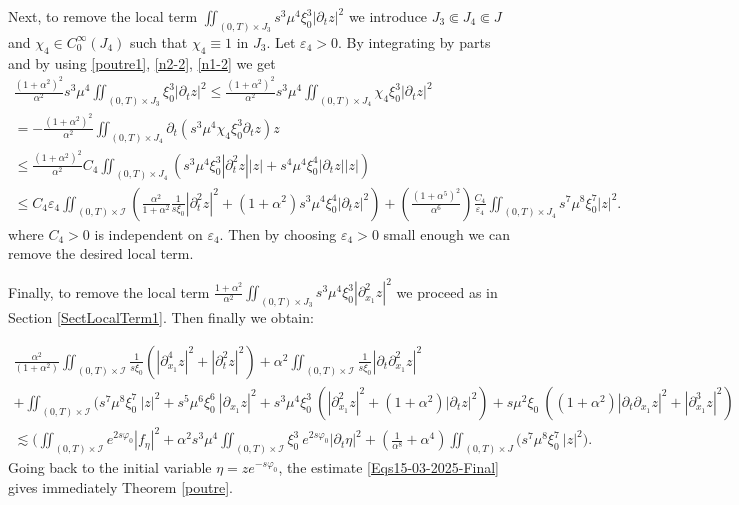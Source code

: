 \documentclass[a4paper, 12pt]{article}
\theoremstyle{plain}
\theoremstyle{definition}
\numberwithin{theorem}{section}
\numberwithin{equation}{section}
\begin{document}
{Next, to remove the local term $\iint_{(0,T)\times J_3}s^3\mu^4\xi^3_0|\partial_tz|^2$ we introduce $J_3\Subset J_4\Subset J$ and $\chi_4\in C_0^\infty(J_4)$ such that $\chi_4\equiv 1$ in $J_3$. Let $\varepsilon_4>0$. 
By integrating by parts and by using \eqref{poutre1}, \eqref{n2-2}, \eqref{n1-2} we get 
\begin{multline*}
    \frac{(1+\alpha^2)^2}{\alpha^2} s^3\mu^4 \iint_{(0,T)\times J_3}\xi_0^3|\partial_t z|^2\leq \frac{(1+\alpha^2)^2}{\alpha^2} s^3\mu^4 \iint_{(0,T)\times J_4}\chi_4\xi^3_0 |\partial_tz|^2\\
    =
     - \frac{(1+\alpha^2)^2}{\alpha^2} \iint_{(0,T)\times J_4}\partial_t(s^3\mu^4\chi_4\xi_0^3\partial_t z) z\\
    \leq \frac{(1+\alpha^2)^2}{\alpha^2} C_4 \iint_{(0,T)\times J_4}(s^3\mu^4\xi_0^3|\partial_t^2 z||z|+s^4\mu^4\xi_0^4|\partial_t z||z|) \\
    \leq C_4 \varepsilon_4 \iint_{(0,T)\times \mathcal{I}}\left(\frac{\alpha^2}{1+\alpha^2}\frac{1}{s\xi_0}|\partial_t^2 z|^2+(1+\alpha^2)s^3\mu^4\xi_0^4|\partial_tz|^2\right)+\left(\frac{(1+\alpha^{5})^2}{\alpha^6}\right)\frac{C_4}{\varepsilon_4}\iint_{(0,T)\times J_4}s^7\mu^8\xi_0^7|z|^2.
\end{multline*}
where $C_4>0$ is independent on $\varepsilon_4$. Then by choosing $\varepsilon_4>0$ small enough we can remove the desired local term.

Finally, to remove the local term $\frac{1+\alpha^2}{\alpha^2}\iint_{(0,T)\times J_3}s^3\mu^4\xi^3_0|\partial^2_{x_1}z|^2$ we proceed as in Section \ref{SectLocalTerm1}. Then finally we obtain:

\begin{multline}\label{Eqs15-03-2025-Final}
\frac{\alpha^2}{(1+\alpha^2)}\iint_{(0,T)\times\mathcal{I}}\frac{1}{s\xi_0}(|\partial^4_{x_1}z|^2+|\partial^2_tz|^2)+\alpha^2\iint_{(0,T)\times\mathcal{I}}\frac{1}{s\xi_0}|\partial_t\partial^2_{x_1}z|^2\\
+ \iint_{(0,T)\times\mathcal{I}} (s^7\mu^8\xi_0^7~|z|^2+s^5\mu^6\xi_0^6~|\partial_{x_1}z|^2+s^3\mu^4\xi_0^3~(|\partial^2_{x_1}z|^2+(1+\alpha^2)|\partial_{t}z|^2)+s\mu^2\xi_0~((1+\alpha^2)|\partial_t\partial_{x_1}z|^2+|\partial_{x_1}^3z|^2)\\
\lesssim \Big(\iint_{(0,T)\times\mathcal{I}}e^{2s\varphi_0}|f_\eta|^2+\alpha^2s^3\mu^4\iint_{(0,T)\times\mathcal{I}}\xi_0^3~e^{2s\varphi_0}|\partial_t \eta|^2+\left(\frac{1}{\alpha^{8}}+\alpha^{4}\right)\iint_{(0,T)\times J}\Big(s^7\mu^8\xi^7_0~|z|^2\Big).
\end{multline}
Going back to the initial variable $\eta = z e^{-s\varphi_0}$, the estimate \eqref{Eqs15-03-2025-Final}
gives immediately Theorem \ref{poutre}.
}
\end{document}
